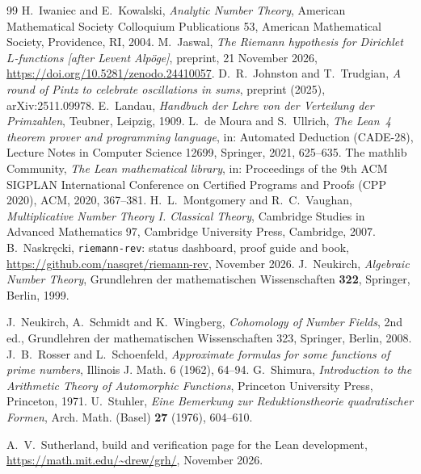 \documentclass[11pt]{amsart}
\theoremstyle{plain}
\theoremstyle{definition}
\numberwithin{equation}{section}
\begin{document}
\begin{thebibliography}{99}
 H.~Iwaniec and E.~Kowalski, \emph{Analytic Number Theory}, American
  Mathematical Society Colloquium Publications 53, American Mathematical Society, Providence, RI, 2004.
 M.~Jaswal, \emph{The Riemann hypothesis for Dirichlet $L$-functions [after Levent
  Alp\"oge]}, preprint, 21 November 2026, \url{https://doi.org/10.5281/zenodo.24410057}.
 D.~R.~Johnston and T.~Trudgian, \emph{A round of Pintz to celebrate
  oscillations in sums}, preprint (2025), arXiv:2511.09978.
 E.~Landau, \emph{Handbuch der Lehre von der Verteilung der Primzahlen}, Teubner,
  Leipzig, 1909.
 L.~de Moura and S.~Ullrich, \emph{The Lean~4 theorem prover and programming
  language}, in: Automated Deduction (CADE-28), Lecture Notes in Computer Science 12699, Springer,
  2021, 625--635.
 The mathlib Community, \emph{The Lean mathematical library}, in: Proceedings of
  the 9th ACM SIGPLAN International Conference on Certified Programs and Proofs (CPP 2020), ACM, 2020,
  367--381.
 H.~L.~Montgomery and R.~C.~Vaughan, \emph{Multiplicative Number Theory
  I. Classical Theory}, Cambridge Studies in Advanced Mathematics 97, Cambridge University Press,
  Cambridge, 2007.
 B.~Naskr\k{e}cki, \texttt{riemann-rev}: status dashboard, proof guide and book,
  \url{https://github.com/nasqret/riemann-rev}, November 2026.
 J.~Neukirch, \emph{Algebraic Number Theory}, Grundlehren der mathematischen Wissenschaften \textbf{322}, Springer, Berlin, 1999.

 J.~Neukirch, A.~Schmidt and K.~Wingberg, \emph{Cohomology of Number Fields}, 2nd ed.,
  Grundlehren der mathematischen Wissenschaften 323, Springer, Berlin, 2008.
 J.~B.~Rosser and L.~Schoenfeld, \emph{Approximate formulas for some
  functions of prime numbers}, Illinois J. Math. 6 (1962), 64--94.
 G.~Shimura, \emph{Introduction to the Arithmetic Theory of Automorphic Functions},
  Princeton University Press, Princeton, 1971.
 U.~Stuhler, \emph{Eine Bemerkung zur Reduktionstheorie quadratischer Formen}, Arch. Math. (Basel) \textbf{27} (1976), 604--610.

 A.~V.~Sutherland, build and verification page for the Lean development,
  \url{https://math.mit.edu/~drew/grh/}, November 2026.
\end{thebibliography}

\appendix
\end{document}
